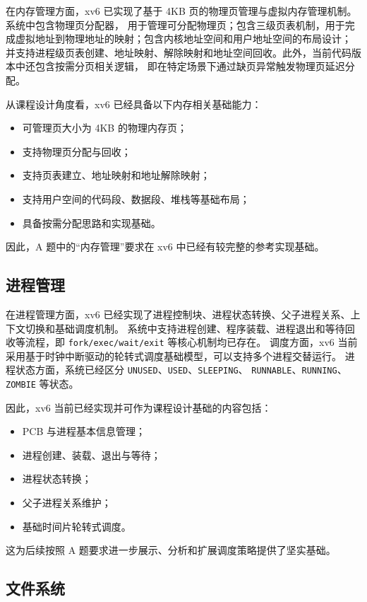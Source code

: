 \documentclass[12pt,a4paper]{ctexart}
\begin{document}
在内存管理方面，xv6 已实现了基于 4KB 页的物理页管理与虚拟内存管理机制。系统中包含物理页分配器，
用于管理可分配物理页；包含三级页表机制，用于完成虚拟地址到物理地址的映射；包含内核地址空间和用户地址空间的布局设计；
并支持进程级页表创建、地址映射、解除映射和地址空间回收。此外，当前代码版本中还包含按需分页相关逻辑，
即在特定场景下通过缺页异常触发物理页延迟分配。

从课程设计角度看，xv6 已经具备以下内存相关基础能力：

\begin{itemize}
  \item 可管理页大小为 4KB 的物理内存页；
  \item 支持物理页分配与回收；
  \item 支持页表建立、地址映射和地址解除映射；
  \item 支持用户空间的代码段、数据段、堆栈等基础布局；
  \item 具备按需分配思路和实现基础。
\end{itemize}

因此，A 题中的“内存管理”要求在 xv6 中已经有较完整的参考实现基础。

\subsection{进程管理}

在进程管理方面，xv6 已经实现了进程控制块、进程状态转换、父子进程关系、上下文切换和基础调度机制。
系统中支持进程创建、程序装载、进程退出和等待回收等流程，即 \texttt{fork/exec/wait/exit} 等核心机制均已存在。
调度方面，xv6 当前采用基于时钟中断驱动的轮转式调度基础模型，可以支持多个进程交替运行。
进程状态方面，系统已经区分 \texttt{UNUSED}、\texttt{USED}、\texttt{SLEEPING}、
\texttt{RUNNABLE}、\texttt{RUNNING}、\texttt{ZOMBIE} 等状态。

因此，xv6 当前已经实现并可作为课程设计基础的内容包括：

\begin{itemize}
  \item PCB 与进程基本信息管理；
  \item 进程创建、装载、退出与等待；
  \item 进程状态转换；
  \item 父子进程关系维护；
  \item 基础时间片轮转式调度。
\end{itemize}

这为后续按照 A 题要求进一步展示、分析和扩展调度策略提供了坚实基础。

\subsection{文件系统}
\end{document}
